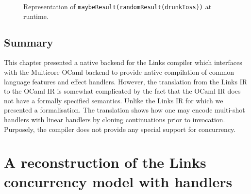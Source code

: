 \documentclass[12pt,mscres,cdtppar,twoside,openright,logo,rightchapter,normalheadings]{infthesis}
\theoremstyle{definition}
\begin{document}
\begin{figure}
\centering
{}
\caption{Representation of \lstinline$maybeResult(randomResult(drunkToss))$ at runtime.}\label{fig:rtstack}
\end{figure}

\section{Summary}
This chapter presented a native backend for the Links compiler which
interfaces with the Multicore OCaml backend to provide native
compilation of common language features and effect handlers. However,
the translation from the Links IR to the OCaml IR is somewhat
complicated by the fact that the OCaml IR does not have a formally
specified semantics. Unlike the Links IR for which we presented a
formalisation. The translation shows how one may encode multi-shot
handlers with linear handlers by cloning continuations prior to
invocation. Purposely, the compiler does not provide any special
support for concurrency.

\chapter{A reconstruction of the Links concurrency model with handlers}
\label{ch:concurrency}
\end{document}
